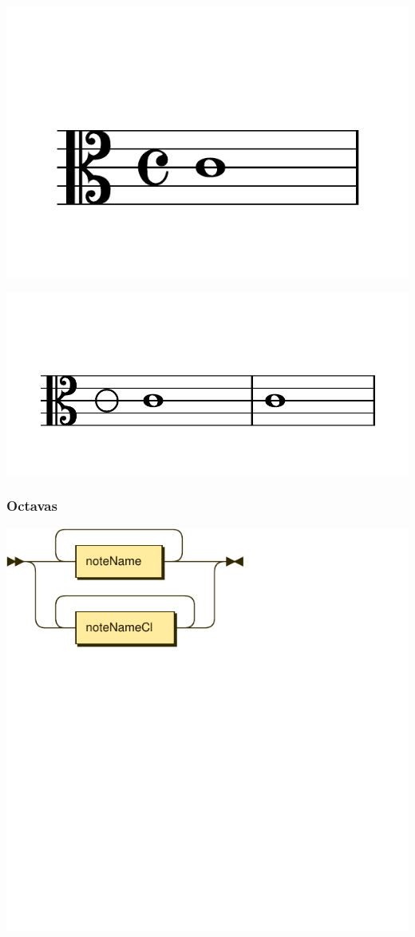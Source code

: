 \documentclass{article}
\begin{document}
\includegraphics[scale=0.5]{figures_tests/pdf/skern/timesignature1.pdf}

\includegraphics[scale=0.5]{figures_tests/pdf/skern/timesignature3.pdf}

\subsubsection{Octavas}

\includegraphics[scale=0.5]{figures_railroad/pdf/skern/octaves.pdf}
\end{document}
